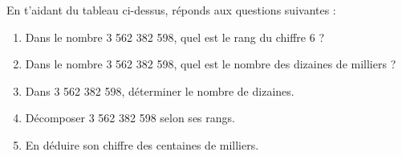 \begin{Exemple}

En t'aidant du tableau ci-dessus, réponds aux questions suivantes : 
\begin{enumerate}
\item Dans le nombre 3 562 382 598, quel est le rang du chiffre 6 ?

\ligne

\item Dans le nombre 3 562 382 598, quel est le nombre des dizaines de milliers ? 

\ligne

\item Dans  3 562 382 598, déterminer le nombre de dizaines. 

\ligne

\item Décomposer 3 562 382 598 selon ses rangs. 

\ligne

\ligne

\item En déduire son chiffre des centaines de milliers.

\ligne

\end{enumerate}
\vspace{-0.2cm}
\end{Exemple}


